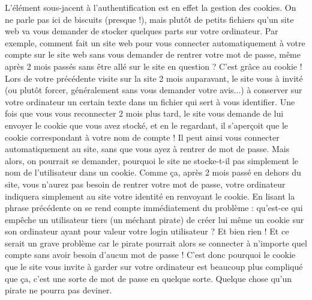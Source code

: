 \documentclass[a4paper,12pt]{article}
\begin{document}
L'élément sous-jacent à l'authentification est en effet la gestion des cookies. On ne parle pas ici de biscuits (presque !), mais plutôt de petits fichiers qu'un site web va vous demander de stocker quelques parts sur votre ordinateur. Par exemple, comment fait un site web pour vous connecter automatiquement à votre compte sur le site web sans vous demander de rentrer votre mot de passe, même après 2 mois passés sans être allé sur le site en question ? C'est grâce au cookie ! Lors de votre précédente visite sur la site 2 mois auparavant, le site vous à invité (ou plutôt forcer, généralement sans vous demander votre avis...) à conserver sur votre ordinateur un certain texte dans un fichier qui sert à vous identifier. Une fois que vous vous reconnecter 2 mois plus tard, le site vous demande de lui envoyer le cookie que vous avez stocké, et en le regardant, il s'aperçoit que le cookie correspondant à votre nom de compte ! Il peut ainsi vous connecter automatiquement au site, sans que vous ayez à rentrer de mot de passe.
Mais alors, on pourrait se demander, pourquoi le site ne stocke-t-il pas simplement le nom de l'utilisateur dans un cookie. Comme ça, après 2 mois passé en dehors du site, vous n'aurez pas besoin de rentrer votre mot de passe, votre ordinateur indiquera simplement au site votre identité en renvoyant le cookie. En lisant la phrase précédente on se rend compte immédiatement du problème : qu'est-ce qui empêche un utilisateur tiers (un méchant pirate) de créer lui même un cookie sur son ordinateur ayant pour valeur votre login utilisateur ? Et bien rien ! Et ce serait un grave problème car le pirate pourrait alors se connecter à n'importe quel compte sans avoir besoin d'aucun mot de passe !
C'est donc pourquoi le cookie que le site vous invite à garder sur votre ordinateur est beaucoup plus compliqué que ça, c'est une sorte de mot de passe en quelque sorte. Quelque chose qu'un pirate ne pourra pas deviner.
\end{document}
